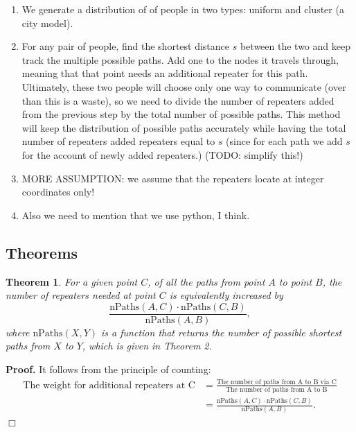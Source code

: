 \documentclass{icmmcm}
\newtheorem{Theo1}{Theorem}
\begin{document}
\begin{enumerate}
\item We generate a distribution of of people in two types: uniform and cluster (a city model).
\item For any pair of people, find the shortest distance $s$ between the two and keep track the multiple possible paths. Add one to the nodes it travels through, meaning that that point needs an additional repeater for this path. Ultimately, these two people will choose only one way to communicate (over than this is a waste), so we need to divide the number of repeaters added from the previous step by the total number of possible paths. This method will keep the distribution of possible paths accurately while having the total number of repeaters added repeaters equal to $s$ (since for each path we add $s$ for the account of newly added repeaters.) (TODO: simplify this!)
\item MORE ASSUMPTION: we assume that the repeaters locate at integer coordinates only!
\item Also we need to mention that we use python, I think.
\end{enumerate}
\subsection{Theorems}
\begin{Theo1}
For a given point $C$, of all the paths from point $A$ to point $B$, the number of repeaters needed at point $C$ is equivalently increased by 
$$\frac{\text{nPaths}(A,C)\cdot \text{nPaths}(C,B)}{\text{nPaths}(A,B)},$$
where $\text{nPaths}(X,Y)$ is a function that returns the number of possible \emph{shortest} paths from $X$ to $Y$, which is given in Theorem 2.
\end{Theo1}
{\bf Proof.}
It follows from the principle of counting:
\begin{align*} \text{The weight for additional repeaters at C}
&=\frac{\text{The number of paths from A to B via C}}{\text{The number of paths from A to B}}\\
&=\frac{\text{nPaths}(A,C)\cdot \text{nPaths}(C,B)}{\text{nPaths}(A,B)}.
\end{align*}\hfill $\Box$
\end{document}
